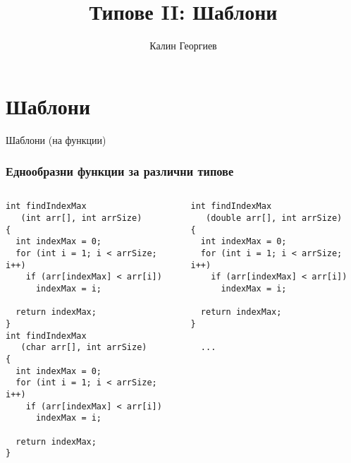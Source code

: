 \documentclass{beamer}
\begin{document}
\title[Обектно ориентирано програмиране]{Типове II: Шаблони}
\author{Калин Георгиев}
\frame{\titlepage}

\section{Шаблони}


\begin{frame}
\centerline{Шаблони (на функции)}
\end{frame}


\begin{frame}[fragile]
\frametitle{Еднообразни функции за различни типове}



\begin{columns}[t]
  \begin{column}{0.5\textwidth}

\begin{flushleft}
\begin{lstlisting}
int findIndexMax
   (int arr[], int arrSize)
{
  int indexMax = 0;
  for (int i = 1; i < arrSize; i++)
    if (arr[indexMax] < arr[i])
      indexMax = i;

  return indexMax;
}
int findIndexMax
   (char arr[], int arrSize)
{
  int indexMax = 0;
  for (int i = 1; i < arrSize; i++)
    if (arr[indexMax] < arr[i])
      indexMax = i;

  return indexMax;
}
\end{lstlisting}
\end{flushleft}

  \end{column}
  \begin{column}{0.5\textwidth}
\begin{flushleft}
\begin{lstlisting}
int findIndexMax
   (double arr[], int arrSize)
{
  int indexMax = 0;
  for (int i = 1; i < arrSize; i++)
    if (arr[indexMax] < arr[i])
      indexMax = i;

  return indexMax;
}

  ...

\end{lstlisting}
\end{flushleft}

  \end{column}
\end{columns}


\end{frame}
\end{document}
